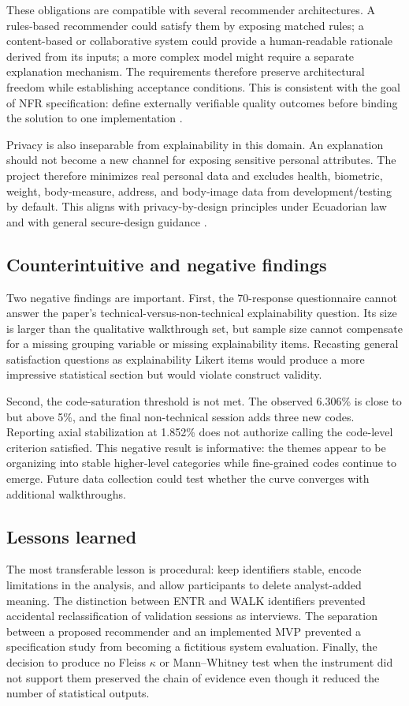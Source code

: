 \documentclass[pdflatex,sn-basic]{sn-jnl}
\begin{document}
These obligations are compatible with several recommender architectures. A rules-based recommender could satisfy them by exposing matched rules; a content-based or collaborative system could provide a human-readable rationale derived from its inputs; a more complex model might require a separate explanation mechanism. The requirements therefore preserve architectural freedom while establishing acceptance conditions. This is consistent with the goal of NFR specification: define externally verifiable quality outcomes before binding the solution to one implementation \cite{glinz2007,iso25010}.

Privacy is also inseparable from explainability in this domain. An explanation should not become a new channel for exposing sensitive personal attributes. The project therefore minimizes real personal data and excludes health, biometric, weight, body-measure, address, and body-image data from development/testing by default. This aligns with privacy-by-design principles under Ecuadorian law and with general secure-design guidance \cite{lopdp2021,spdp2025,owasp2025,nist2025}.

\subsection{Counterintuitive and negative findings}
Two negative findings are important. First, the 70-response questionnaire cannot answer the paper's technical-versus-non-technical explainability question. Its size is larger than the qualitative walkthrough set, but sample size cannot compensate for a missing grouping variable or missing explainability items. Recasting general satisfaction questions as explainability Likert items would produce a more impressive statistical section but would violate construct validity.

Second, the code-saturation threshold is not met. The observed 6.306\% is close to but above 5\%, and the final non-technical session adds three new codes. Reporting axial stabilization at 1.852\% does not authorize calling the code-level criterion satisfied. This negative result is informative: the themes appear to be organizing into stable higher-level categories while fine-grained codes continue to emerge. Future data collection could test whether the curve converges with additional walkthroughs.

\subsection{Lessons learned}
The most transferable lesson is procedural: keep identifiers stable, encode limitations in the analysis, and allow participants to delete analyst-added meaning. The distinction between ENTR and WALK identifiers prevented accidental reclassification of validation sessions as interviews. The separation between a proposed recommender and an implemented MVP prevented a specification study from becoming a fictitious system evaluation. Finally, the decision to produce no Fleiss $\kappa$ or Mann--Whitney test when the instrument did not support them preserved the chain of evidence even though it reduced the number of statistical outputs.
\end{document}
